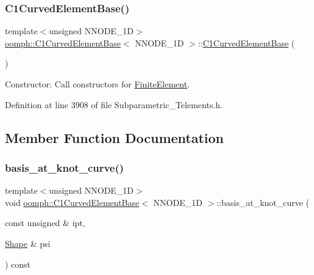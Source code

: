 \subsubsection{\texorpdfstring{C1\+Curved\+Element\+Base()}{C1CurvedElementBase()}}
{\footnotesize\ttfamily template$<$unsigned N\+N\+O\+D\+E\+\_\+1D$>$ \\
\hyperlink{classoomph_1_1C1CurvedElementBase}{oomph\+::\+C1\+Curved\+Element\+Base}$<$ N\+N\+O\+D\+E\+\_\+1D $>$\+::\hyperlink{classoomph_1_1C1CurvedElementBase}{C1\+Curved\+Element\+Base} (\begin{DoxyParamCaption}{ }\end{DoxyParamCaption})\hspace{0.3cm}{\ttfamily [inline]}}



Constructor\+: Call constructors for \hyperlink{classoomph_1_1FiniteElement}{Finite\+Element}. 



Definition at line 3908 of file Subparametric\+\_\+\+Telements.\+h.



\subsection{Member Function Documentation}
\mbox{\label{classoomph_1_1C1CurvedElementBase_a849f18e06c42052a964fc6ee499b3c94}} 
\subsubsection{\texorpdfstring{basis\+\_\+at\+\_\+knot\+\_\+curve()}{basis\_at\_knot\_curve()}}
{\footnotesize\ttfamily template$<$unsigned N\+N\+O\+D\+E\+\_\+1D$>$ \\
void \hyperlink{classoomph_1_1C1CurvedElementBase}{oomph\+::\+C1\+Curved\+Element\+Base}$<$ N\+N\+O\+D\+E\+\_\+1D $>$\+::basis\+\_\+at\+\_\+knot\+\_\+curve (\begin{DoxyParamCaption}\item[{const unsigned \&}]{ipt,  }\item[{\hyperlink{classoomph_1_1Shape}{Shape} \&}]{psi }\end{DoxyParamCaption}) const\hspace{0.3cm}{\ttfamily [inline]}}



